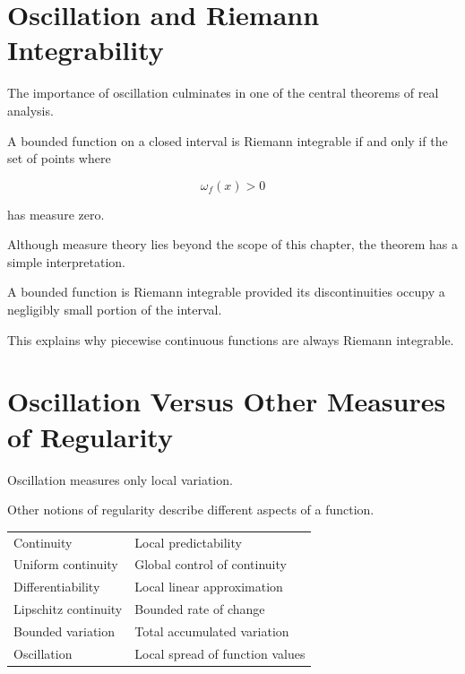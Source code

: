\documentclass{essay}
\begin{document}
\section{Oscillation and Riemann Integrability}

The importance of oscillation culminates in one of the central theorems of real
analysis.

\begin{theorem}

A bounded function on a closed interval is Riemann integrable if and only if the
set of points where

\[
\omega_f(x)>0
\]

has measure zero.

\end{theorem}

Although measure theory lies beyond the scope of this chapter, the theorem has a
simple interpretation.

A bounded function is Riemann integrable provided its discontinuities occupy a
negligibly small portion of the interval.

This explains why piecewise continuous functions are always Riemann integrable.


\section{Oscillation Versus Other Measures of Regularity}

Oscillation measures only local variation.

Other notions of regularity describe different aspects of a function.

\begin{center}
\begin{tabular}{ll}
Continuity & Local predictability\\
Uniform continuity & Global control of continuity\\
Differentiability & Local linear approximation\\
Lipschitz continuity & Bounded rate of change\\
Bounded variation & Total accumulated variation\\
Oscillation & Local spread of function values
\end{tabular}
\end{center}
\end{document}
